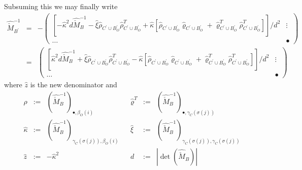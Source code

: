 \documentclass[a4paper]{article}
\begin{document}
Subsuming this we may finally write
\begin{eqnarray}
\label{def:update_Z2}
\hat{\check{M}}_{B^{\prime}}^{-1}
&=&
-
\left(
\begin{array}{c|c}
\left[
  -\hat{\kappa}^{2}d\hat{\check{M}}_{B}^{-1}
  -\hat{\xi}
  \hat{\rho}_{C^{\prime} \cup B_{O}^{\prime}}
  \hat{\rho}_{C^{\prime} \cup B_{O}^{\prime}}^{T}
  +\hat{\kappa}
  \left[
    \hat{\rho}_{C^{\prime} \cup B_{O}^{\prime}}
    \hat{\varrho}_{C^{\prime} \cup B_{O}^{\prime}}
    +\hat{\varrho}_{C^{\prime} \cup B_{O}^{\prime}}^{T}
    \hat{\rho}_{C^{\prime} \cup B_{O}^{\prime}}^{T}
  \right]
\right]/d^{2}
&
\vdots
\\
\hline
\hdots
&
\bullet
\end{array}
\right)
\nonumber \\
&=&
\left(
\begin{array}{c|c}
\left[
  \hat{\kappa}^{2}d\hat{\check{M}}_{B}^{-1}
  +\hat{\xi}
  \hat{\rho}_{C^{\prime} \cup B_{O}^{\prime}}
  \hat{\rho}_{C^{\prime} \cup B_{O}^{\prime}}^{T}
  -\hat{\kappa}
  \left[
    \hat{\rho}_{C^{\prime} \cup B_{O}^{\prime}}
    \hat{\varrho}_{C^{\prime} \cup B_{O}^{\prime}}
    +\hat{\varrho}_{C^{\prime} \cup B_{O}^{\prime}}^{T}
    \hat{\rho}_{C^{\prime} \cup B_{O}^{\prime}}^{T}
  \right]
\right]/d^{2}
&
\vdots
\\
\hline
\hdots
&
\bullet
\end{array}
\right)
\end{eqnarray}
where $\hat{z}$ is the new denominator and 
\begin{equation}
\label{def:update_Z2_entities}
\begin{array}{rclcrcl}
\hat{\rho}
&:=&
\left(
  \hat{\check{M}}_{B}^{-1}
\right)_{\bullet, \beta_{O}(i)}
&&
\hat{\varrho}^{T}
&:=&
\left(
  \hat{\check{M}}_{B}^{-1}
\right)_{\bullet, \gamma_{C}(\sigma(j))}
\\
\hat{\kappa}
&:=&
\left(
  \hat{\check{M}}_{B}^{-1}
\right)_{\gamma_{C}(\sigma(j)), \beta_{O}(i)}
&&
\hat{\xi}
&:=&
\left(
  \hat{\check{M}}_{B}^{-1}
\right)_{\gamma_{C}(\sigma(j)), \gamma_{C}(\sigma(j))}
\\
\hat{z}
&:=&
-\hat{\kappa}^{2}
&&
d
&:=&
\left|\det(\hat{\check{M}}_{B})\right|
\end{array}
\end{equation}
\end{document}
